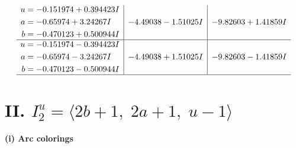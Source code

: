\documentclass[1p]{elsarticle_modified}
\theoremstyle{definition}
\begin{document}
$$\begin{array}{c|c|c}
\begin{aligned}
u &= -0.151974 + 0.394423 I \\
a &= -0.65974 + 3.24267 I \\
b &= -0.470123 + 0.500944 I\end{aligned}
 & -4.49038 - 1.51025 I & -9.82603 + 1.41859 I \\ \hline\begin{aligned}
u &= -0.151974 - 0.394423 I \\
a &= -0.65974 - 3.24267 I \\
b &= -0.470123 - 0.500944 I\end{aligned}
 & -4.49038 + 1.51025 I & -9.82603 - 1.41859 I\\
 \hline 
 \end{array}$$\newpage\newpage\renewcommand{\arraystretch}{1}
\centering \section*{II. $I^u_{2}= \langle 2 b+1,\;2 a+1,\;u-1 \rangle$}
\flushleft \textbf{(i) Arc colorings}\\
\end{document}

